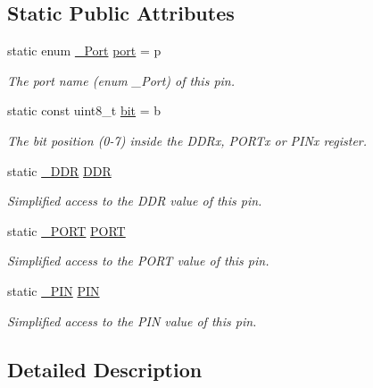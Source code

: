 \subsection*{Static Public Attributes}
\begin{DoxyCompactItemize}
\item 
static enum \hyperlink{namespaceports_a9949317f344930bd6ad1097e80c97b67}{\+\_\+\+Port} \hyperlink{structports_1_1Pin_ad63613b8c14441d28e3f3d935da67e77}{port} = p
\begin{DoxyCompactList}\small\item\em The port name (enum \+\_\+\+Port) of this pin. \end{DoxyCompactList}\item 
static const uint8\+\_\+t \hyperlink{structports_1_1Pin_aea726b85cfe5e49822dd2517da5c860f}{bit} = b
\begin{DoxyCompactList}\small\item\em The bit position (0-\/7) inside the D\+D\+Rx, P\+O\+R\+Tx or P\+I\+Nx register. \end{DoxyCompactList}\item 
static \hyperlink{structports_1_1__Io}{\+\_\+\+D\+DR} \hyperlink{structports_1_1Pin_aaebb4d6cb5db0635fe8e7d6e7d315c7f}{D\+DR}
\begin{DoxyCompactList}\small\item\em Simplified access to the D\+DR value of this pin. \end{DoxyCompactList}\item 
static \hyperlink{structports_1_1__Io}{\+\_\+\+P\+O\+RT} \hyperlink{structports_1_1Pin_aaa08f0eb17ef31d9f46d65d50c8a093e}{P\+O\+RT}
\begin{DoxyCompactList}\small\item\em Simplified access to the P\+O\+RT value of this pin. \end{DoxyCompactList}\item 
static \hyperlink{structports_1_1__Io}{\+\_\+\+P\+IN} \hyperlink{structports_1_1Pin_ae2e45a41082457c350f71f7a720265d4}{P\+IN}
\begin{DoxyCompactList}\small\item\em Simplified access to the P\+IN value of this pin. \end{DoxyCompactList}\end{DoxyCompactItemize}


\subsection{Detailed Description}
